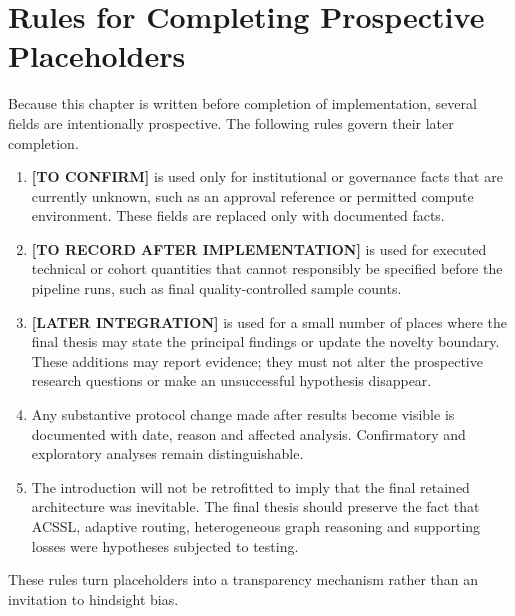 \section{Rules for Completing Prospective Placeholders}
\label{sec:intro-placeholders}

Because this chapter is written before completion of implementation, several fields
are intentionally prospective. The following rules govern their later completion.

\begin{enumerate}
  \item \textbf{[TO CONFIRM]} is used only for institutional or governance facts
        that are currently unknown, such as an approval reference or permitted
        compute environment. These fields are replaced only with documented facts.

  \item \textbf{[TO RECORD AFTER IMPLEMENTATION]} is used for executed technical or
        cohort quantities that cannot responsibly be specified before the pipeline
        runs, such as final quality-controlled sample counts.

  \item \textbf{[LATER INTEGRATION]} is used for a small number of places where the
        final thesis may state the principal findings or update the novelty boundary.
        These additions may report evidence; they must not alter the prospective
        research questions or make an unsuccessful hypothesis disappear.

  \item Any substantive protocol change made after results become visible is
        documented with date, reason and affected analysis. Confirmatory and
        exploratory analyses remain distinguishable.

  \item The introduction will not be retrofitted to imply that the final retained
        architecture was inevitable. The final thesis should preserve the fact that
        ACSSL, adaptive routing, heterogeneous graph reasoning and supporting losses
        were hypotheses subjected to testing.
\end{enumerate}

These rules turn placeholders into a transparency mechanism rather than an invitation
to hindsight bias.

